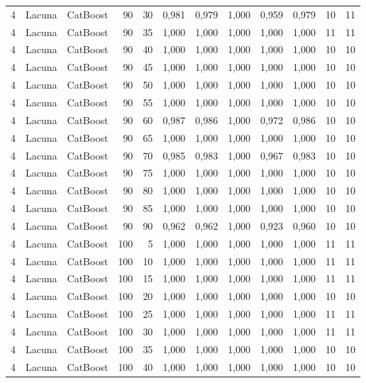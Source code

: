 \begin{longtable}{@{}rllrrrrrrrrr@{}}
4 & Lacuna & CatBoost & 90 & 30 & 0,981 & 0,979 & 1,000 & 0,959 & 0,979 & 10 & 11 \\
4 & Lacuna & CatBoost & 90 & 35 & 1,000 & 1,000 & 1,000 & 1,000 & 1,000 & 11 & 11 \\
4 & Lacuna & CatBoost & 90 & 40 & 1,000 & 1,000 & 1,000 & 1,000 & 1,000 & 10 & 10 \\
4 & Lacuna & CatBoost & 90 & 45 & 1,000 & 1,000 & 1,000 & 1,000 & 1,000 & 10 & 10 \\
4 & Lacuna & CatBoost & 90 & 50 & 1,000 & 1,000 & 1,000 & 1,000 & 1,000 & 10 & 10 \\
4 & Lacuna & CatBoost & 90 & 55 & 1,000 & 1,000 & 1,000 & 1,000 & 1,000 & 10 & 10 \\
4 & Lacuna & CatBoost & 90 & 60 & 0,987 & 0,986 & 1,000 & 0,972 & 0,986 & 10 & 10 \\
4 & Lacuna & CatBoost & 90 & 65 & 1,000 & 1,000 & 1,000 & 1,000 & 1,000 & 10 & 10 \\
4 & Lacuna & CatBoost & 90 & 70 & 0,985 & 0,983 & 1,000 & 0,967 & 0,983 & 10 & 10 \\
4 & Lacuna & CatBoost & 90 & 75 & 1,000 & 1,000 & 1,000 & 1,000 & 1,000 & 10 & 10 \\
4 & Lacuna & CatBoost & 90 & 80 & 1,000 & 1,000 & 1,000 & 1,000 & 1,000 & 10 & 10 \\
4 & Lacuna & CatBoost & 90 & 85 & 1,000 & 1,000 & 1,000 & 1,000 & 1,000 & 10 & 10 \\
4 & Lacuna & CatBoost & 90 & 90 & 0,962 & 0,962 & 1,000 & 0,923 & 0,960 & 10 & 10 \\
4 & Lacuna & CatBoost & 100 & 5 & 1,000 & 1,000 & 1,000 & 1,000 & 1,000 & 11 & 11 \\
4 & Lacuna & CatBoost & 100 & 10 & 1,000 & 1,000 & 1,000 & 1,000 & 1,000 & 11 & 11 \\
4 & Lacuna & CatBoost & 100 & 15 & 1,000 & 1,000 & 1,000 & 1,000 & 1,000 & 11 & 11 \\
4 & Lacuna & CatBoost & 100 & 20 & 1,000 & 1,000 & 1,000 & 1,000 & 1,000 & 10 & 10 \\
4 & Lacuna & CatBoost & 100 & 25 & 1,000 & 1,000 & 1,000 & 1,000 & 1,000 & 11 & 11 \\
4 & Lacuna & CatBoost & 100 & 30 & 1,000 & 1,000 & 1,000 & 1,000 & 1,000 & 11 & 11 \\
4 & Lacuna & CatBoost & 100 & 35 & 1,000 & 1,000 & 1,000 & 1,000 & 1,000 & 10 & 10 \\
4 & Lacuna & CatBoost & 100 & 40 & 1,000 & 1,000 & 1,000 & 1,000 & 1,000 & 10 & 10 \\

\end{longtable}
